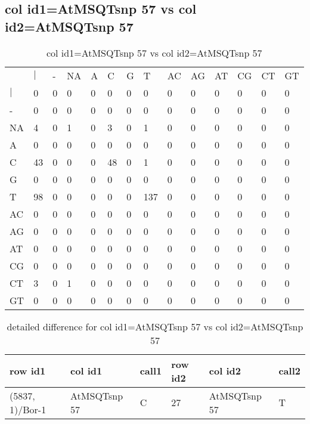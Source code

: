 \subsection{col id1=AtMSQTsnp 57 vs col id2=AtMSQTsnp 57}
\begin{center}
\begin{longtable}{|l|l|l|l|l|l|l|l|l|l|l|l|l|l|}
\caption{col id1=AtMSQTsnp 57 vs col id2=AtMSQTsnp 57} \label{table_dm940}\\
\hline
\\
\hline
&$|$&-&NA&A&C&G&T&AC&AG&AT&CG&CT&GT\\
$|$&0&0&0&0&0&0&0&0&0&0&0&0&0\\
-&0&0&0&0&0&0&0&0&0&0&0&0&0\\
NA&4&0&1&0&3&0&1&0&0&0&0&0&0\\
A&0&0&0&0&0&0&0&0&0&0&0&0&0\\
C&43&0&0&0&48&0&1&0&0&0&0&0&0\\
G&0&0&0&0&0&0&0&0&0&0&0&0&0\\
T&98&0&0&0&0&0&137&0&0&0&0&0&0\\
AC&0&0&0&0&0&0&0&0&0&0&0&0&0\\
AG&0&0&0&0&0&0&0&0&0&0&0&0&0\\
AT&0&0&0&0&0&0&0&0&0&0&0&0&0\\
CG&0&0&0&0&0&0&0&0&0&0&0&0&0\\
CT&3&0&1&0&0&0&0&0&0&0&0&0&0\\
GT&0&0&0&0&0&0&0&0&0&0&0&0&0\\
\hline
\end{longtable}
\end{center}

\begin{center}
\begin{longtable}{|l|l|l|l|l|l|}
\caption{detailed difference for col id1=AtMSQTsnp 57 vs col id2=AtMSQTsnp 57} \label{table_dm941}\\
\hline
row id1&col id1&call1&row id2&col id2&call2\\
\hline
(5837, 1)/Bor-1&AtMSQTsnp 57&C&27&AtMSQTsnp 57&T\\
\hline
\end{longtable}
\end{center}

